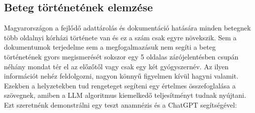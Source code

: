 \documentclass{article}
\begin{document}
\begin{multicols}{2}
\subsection{Beteg történetének elemzése}
Magyarországon a fejlődő adattárolás és dokumentáció hatására minden betegnek több oldalnyi kórházi története van és ez a szám csak egyre  növekszik. Sem a dokumentumok terjedelme sem a megfogalmazásuk nem segíti a beteg történetének gyors megismerését sokszor egy 5 oldalas zárójelentésben csupán néhány mondat tér el az előzőtől vagy csak egy két gyógyszernév. Az ilyen információt nehéz feldolgozni, nagyon könnyű figyelmen kívül hagyni valamit. Ezekben a helyzetekben tud rengeteget segíteni egy értelmes összefoglalása a szövegnek, amiben a LLM algoritmus kiemelkedő teljesítményt tudnak nyújtani. Ezt szeretnénk demonstrálni egy teszt anamnézis és a ChatGPT segítségével:



\end{multicols}
\end{document}
